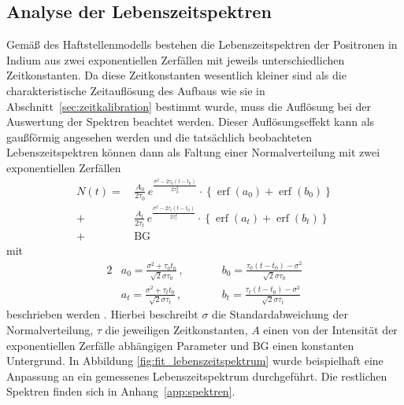 \documentclass[11pt, a4paper]{article}
\numberwithin{equation}{section}
\DeclareMathOperator{\erf}{erf}
\begin{document}
\subsection{Analyse der Lebenszeitspektren}
\label{sec:analyse_lebenszeitspektren}
Gemäß des Haftstellenmodells bestehen die Lebenszeitspektren der Positronen in Indium aus zwei exponentiellen Zerfällen mit jeweils unterschiedlichen Zeitkonstanten.
Da diese Zeitkonstanten wesentlich kleiner sind als die charakteristische Zeitauflösung des Aufbaus wie sie in Abschnitt~\ref{sec:zeitkalibration} bestimmt wurde, muss die Auflösung bei der Auswertung der Spektren beachtet werden.
Dieser Auflösungseffekt kann als gaußförmig angesehen werden und die tatsächlich beobachteten Lebenszeitspektren können dann als Faltung einer Normalverteilung mit zwei exponentiellen Zerfällen
\begin{align}
	N(t) = \, &\frac{A_0}{2 \tau_0} \, e^{\frac{\sigma^2 - 2 \tau_0 (t - t_0)}{2 \tau_0^2}} \cdot \left\{ \erf(a_0) + \erf(b_0) \right\} \nonumber\\
	+ &\frac{A_t}{2 \tau_t} \, e^{\frac{\sigma^2 - 2 \tau_t (t - t_0)}{2 \tau_t^2}} \cdot \left\{ \erf(a_t) + \erf(b_t) \right\} \nonumber\\
	+ &\mathrm{BG}
	\label{eq:spektrum_fit}
\end{align}
mit
\begin{alignat*}{2}
	&a_0 = \frac{\sigma^2 + \tau_0 t_0}{\sqrt{2} \sigma \tau_0} \,\text{,} \qquad
	&&b_0 = \frac{\tau_0 (t - t_0) - \sigma^2}{\sqrt{2} \sigma \tau_0} \\
	&a_t = \frac{\sigma^2 + \tau_t t_0}{\sqrt{2} \sigma \tau_t} \,\text{,} \qquad
	&&b_t = \frac{\tau_t (t - t_0) - \sigma^2}{\sqrt{2} \sigma \tau_t}
\end{alignat*}
beschrieben werden \cite{add_infos}.
Hierbei beschreibt $\sigma$ die Standardabweichung der Normalverteilung, $\tau$ die jeweiligen Zeitkonstanten, $A$ einen von der Intensität der exponentiellen Zerfälle abhängigen Parameter und $\mathrm{BG}$ einen konstanten Untergrund.
In Abbildung \ref{fig:fit_lebenszeitspektrum} wurde beispielhaft eine Anpassung an ein gemessenes Lebenszeitspektrum durchgeführt.
Die restlichen Spektren finden sich in Anhang~\ref{app:spektren}.
\end{document}
